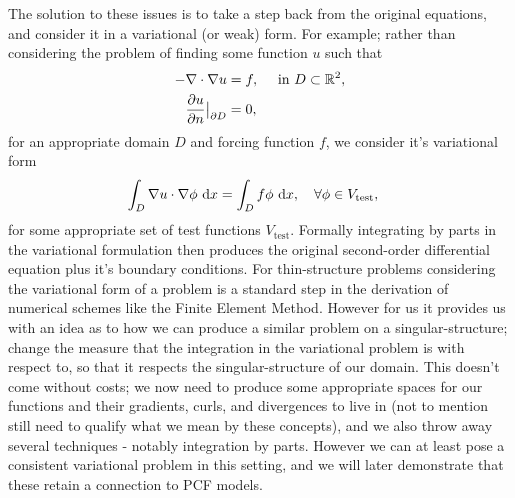 The solution to these issues is to take a step back from the original equations, and consider it in a variational (or weak) form.
For example; rather than considering the problem of finding some function $u$ such that 
\begin{align*}
	-\nabla\cdot\nabla u &= f, \quad\text{ in } D\subset\mathbb{R}^2, \\
	\dfrac{\partial u}{\partial n}\big\vert_{\partial D} &= 0,
\end{align*}
for an appropriate domain $D$ and forcing function $f$, we consider it's variational form
\begin{align*}
	\int_{D}\nabla u \cdot \nabla \phi \ \mathrm{d}x &= \int_{D}f\phi \ \mathrm{d}x, \quad\forall \phi\in V_{\mathrm{test}},
\end{align*}
for some appropriate set of test functions $V_{\mathrm{test}}$.
Formally integrating by parts in the variational formulation then produces the original second-order differential equation plus it's boundary conditions.
For thin-structure problems considering the variational form of a problem is a standard step in the derivation of numerical schemes like the Finite Element Method.
However for us it provides us with an idea as to how we can produce a similar problem on a singular-structure; change the measure that the integration in the variational problem is with respect to, so that it respects the singular-structure of our domain.
This doesn't come without costs; we now need to produce some appropriate spaces for our functions and their gradients, curls, and divergences to live in (not to mention still need to qualify what we mean by these concepts), and we also throw away several techniques - notably integration by parts.
However we can at least pose a consistent variational problem in this setting, and we will later demonstrate that these retain a connection to PCF models. \newline

